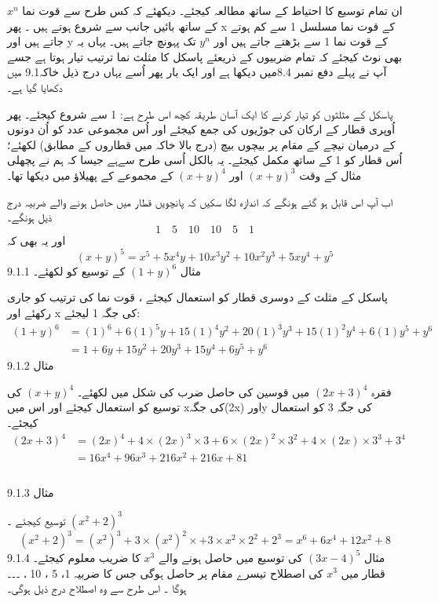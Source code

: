 ان تمام توسیع کا احتیاط کے ساتھ مطالعہ کیجئے۔ دیکھئے کہ کس طرح سے قوت نما 
   \(x^{n}\)
کے ساتھ  بائیں جانب سے شروع ہوتے ہیں ۔ پھر x کے قوت نما مسلسل 1 سے کم ہوتے جاتے ہیں اور  y کے قوت نما 1 سے بڑھتے جاتے ہیں اور
 \(y^{n}\)
 تک پہونچ جاتے ہیں۔  
یہاں یہ بھی نوٹ کیجئے کہ تمام ضربیوں کے ذریعئے پاسکل کا مثلث نما ترتیب  تیار ہوتا ہے جسے آپ نے پہلے دفع نمبر 8.4میں دیکھا ہے اور ایک بار پھر اُسے یہاں درج ذیل خاکہ9.1 میں دکھایا گیا ہے۔ 

پاسکل کے مثلثوں کو تیار کرنے کا ایک آسان طریقہ کچھ اس طرح ہے: 1 سے شروع کیجئے۔  پھر اُوپری قطار کے ارکان کی جوڑیوں کی جمع کیجئے اور اُس مجموعی عدد کو اُن دونوں کے درمیان نیچے کے مقام پر بیچوں بیچ   (درج بالا خاکہ میں قطاروں کے مطابق)  لکھئے؛   اُس قطار کو 1   کے ساتھ مکمل کیجئے۔   یہ بالکل اُسی طرح  سےہے جیسا   کہ ہم نے پچھلی مثال کے وقت
\( (x+y)^{3}\)
اور
\( (x+y)^{4}\)
کے مجموعے کے پھیلاؤ میں دیکھا تھا۔ 

اب آپ اس قابل ہو گئے ہونگے کہ اندازہ لگا سکیں کہ پانچویں قطار میں  حاصل ہونے والے ضربیہ   درج ذیل ہونگے۔ 
 \[1\quad 5\quad 10\quad 10 \quad 5 \quad 1\]
اور یہ بھی کہ 
 \[(x+y)^{5}=x^{5}+5x^{4}y+10x^{3}y^{2}+10x^{2}y^{3}+5xy^{4}+y^{5}\]
 9.1.1   مثال 
 \((1+y)^{6}\)
کے  توسیع  کو  لکھئے۔ 

	پاسکل کے مثلث کے دوسری قطار کو استعمال کیجئے ، قوت نما کی ترتیب کو جاری رکھئے اور x کی جگہ 1 لیجئے: 
	 \begin{align*}
 (1+y)^{6}&=(1)^{6}+6(1)^{5}y+15(1)^{4}y^{2}+20(1)^{3}y^{3}+15(1)^{2}y^{4}+6(1)y^{5}+y^{6}\\
 &=1+6y+15y^{2}+20y^{3}+15y^{4}+6y^{5}+y^{6}
 \end{align*}
9.1.2   مثال

فقرہ
 \((2x+3)^{4}\)
میں قوسین  کی حاصل ضرب کی شکل میں لکھئے۔ 
\( (x+y)^{4}\)
کی توسیع  کو استعمال کیجئے اور اس میں xکی جگہ(2x) اورy   کی جگہ 3 کو استعمال کیجئے۔ 
 \begin{align*}
 (2x+3)^{4}&=(2x)^{4}+4\times(2x)^{3}\times3+6\times(2x)^{2}\times 3^{2}+4\times (2x)\times 3^{3}+3^{4}\\
 &=16x^{4}+96x^{3}+216x^{2}+216x+81\\
 \end{align*}
 \\
9.1.3   مثال

توسیع کیجئے  ۔
 \((x^{2}+2)^{3}\)\\
  \[(x^{2}+2)^{3}=(x^{2})^{3}+3\times(x^{2})^{2}\times+3\times x^{2}\times 2^{2}+2^{3}=x^{6}+6x^{4}+12x^{2}+8\]
9.1.4   مثال
 \((3x-4)^{5}\)
کی توسیع میں حاصل ہونے والے
 \(x^{3}\)
کا ضریب معلوم کیجئے۔ 
قطار میں
 \(x^{3}\)
کی اصطلاح  تیسرے مقام پر حاصل ہوگی جس کا ضربیہ 1، 5 ، 10 ، ۔۔۔ ہوگا ۔ اس طرح سے وہ اصطلاح  درج ذیل ہوگی۔ 

